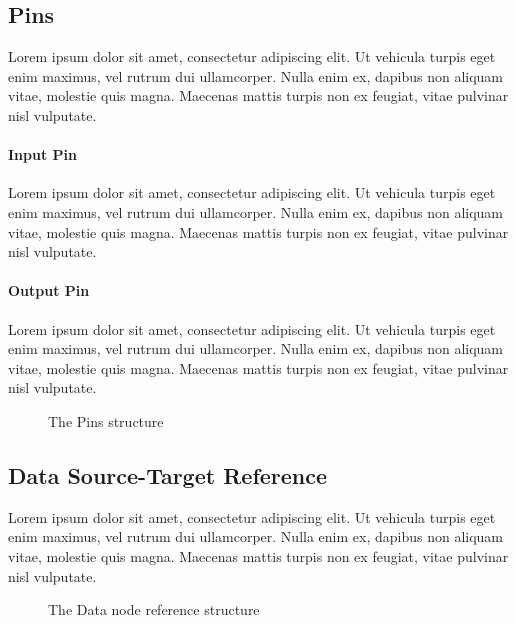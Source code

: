 \subsection{Pins}\label{ssec:pins}

Lorem ipsum dolor sit amet, consectetur adipiscing elit. Ut vehicula turpis eget enim maximus, vel rutrum dui ullamcorper. Nulla enim ex, dapibus non aliquam vitae, molestie quis magna. Maecenas mattis turpis non ex feugiat, vitae pulvinar nisl vulputate.

\paragraph{Input Pin}

Lorem ipsum dolor sit amet, consectetur adipiscing elit. Ut vehicula turpis eget enim maximus, vel rutrum dui ullamcorper. Nulla enim ex, dapibus non aliquam vitae, molestie quis magna. Maecenas mattis turpis non ex feugiat, vitae pulvinar nisl vulputate.

\paragraph{Output Pin}

Lorem ipsum dolor sit amet, consectetur adipiscing elit. Ut vehicula turpis eget enim maximus, vel rutrum dui ullamcorper. Nulla enim ex, dapibus non aliquam vitae, molestie quis magna. Maecenas mattis turpis non ex feugiat, vitae pulvinar nisl vulputate.

\begin{figure}[!ht]
\centering

\caption{The Pins structure}
\label{fig:pins}
\end{figure}

\subsection{Data Source-Target Reference}

Lorem ipsum dolor sit amet, consectetur adipiscing elit. Ut vehicula turpis eget enim maximus, vel rutrum dui ullamcorper. Nulla enim ex, dapibus non aliquam vitae, molestie quis magna. Maecenas mattis turpis non ex feugiat, vitae pulvinar nisl vulputate.

\begin{figure}[!ht]
	\centering
	
	\caption{The Data node reference structure}
	\label{fig:data_source_target_reference}
\end{figure}

